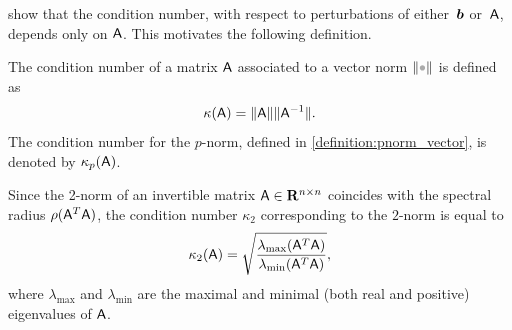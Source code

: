  show that
the condition number, with respect to perturbations of either~$\mathbf{\boldsymbol{b}}$ or~$\mathsf A$,
depends only on $\mathsf A$.
This motivates the following definition.
\begin{definition}
    The condition number of a matrix $\mathsf A$ associated to a vector norm $\norm{\placeholder}$ is defined as
    \[
        \kappa(\mathsf A) = \lVert\mathsf A\rVert \lVert\mathsf A^{-1}\rVert.
    \]
    The condition number for the $p$-norm,
    defined in \cref{definition:pnorm_vector},
    is denoted by $\kappa_p(\mathsf A)$.
\end{definition}
Since the 2-norm of an invertible matrix $\mathsf A \in \mathbf R^{n \times n}$ coincides with the spectral radius $\rho(\mathsf A^T \mathsf A)$,
the condition number $\kappa_2$ corresponding to the $2$-norm is equal to
\[
    \kappa_2(\mathsf A) = \sqrt{\frac{\lambda_{\max}(\mathsf A^T \mathsf A)}{\lambda_{\min}(\mathsf A^T \mathsf A)}},
\]
where $\lambda_{\max}$ and $\lambda_{\min}$ are the maximal and minimal (both real and positive) eigenvalues of $\mathsf A$.
